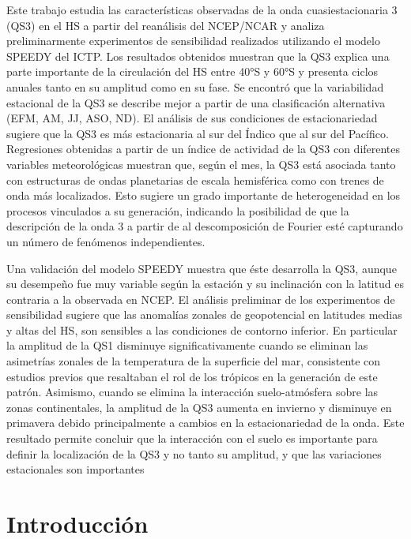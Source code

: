 \documentclass[spanish,a4paper,12pt,oneside]{book}
\begin{document}
Este trabajo estudia las características observadas de la onda
cuasiestacionaria 3 (QS3) en el HS a partir del reanálisis del NCEP/NCAR
y analiza preliminarmente experimentos de sensibilidad realizados
utilizando el modelo SPEEDY del ICTP. Los resultados obtenidos muestran
que la QS3 explica una parte importante de la circulación del HS entre
40°S y 60°S y presenta ciclos anuales tanto en su amplitud como en su
fase. Se encontró que la variabilidad estacional de la QS3 se describe
mejor a partir de una clasificación alternativa (EFM, AM, JJ, ASO, ND).
El análisis de sus condiciones de estacionariedad sugiere que la QS3 es
más estacionaria al sur del Índico que al sur del Pacífico. Regresiones
obtenidas a partir de un índice de actividad de la QS3 con diferentes
variables meteorológicas muestran que, según el mes, la QS3 está
asociada tanto con estructuras de ondas planetarias de escala
hemisférica como con trenes de onda más localizados. Esto sugiere un
grado importante de heterogeneidad en los procesos vinculados a su
generación, indicando la posibilidad de que la descripción de la onda 3
a partir de al descomposición de Fourier esté capturando un número de
fenómenos independientes.

Una validación del modelo SPEEDY muestra que éste desarrolla la QS3,
aunque su desempeño fue muy variable según la estación y su inclinación
con la latitud es contraria a la observada en NCEP. El análisis
preliminar de los experimentos de sensibilidad sugiere que las anomalías
zonales de geopotencial en latitudes medias y altas del HS, son
sensibles a las condiciones de contorno inferior. En particular la
amplitud de la QS1 disminuye significativamente cuando se eliminan las
asimetrías zonales de la temperatura de la superficie del mar,
consistente con estudios previos que resaltaban el rol de los trópicos
en la generación de este patrón. Asimismo, cuando se elimina la
interacción suelo-atmósfera sobre las zonas continentales, la amplitud
de la QS3 aumenta en invierno y disminuye en primavera debido
principalmente a cambios en la estacionariedad de la onda. Este
resultado permite concluir que la interacción con el suelo es importante
para definir la localización de la QS3 y no tanto su amplitud, y que las
variaciones estacionales son importantes

\restoregeometry
\setcounter{tocdepth}{3} \tableofcontents

\listoffigures
\newpage

\mainmatter

\chapter{Introducción}\label{introduccion}
\end{document}
